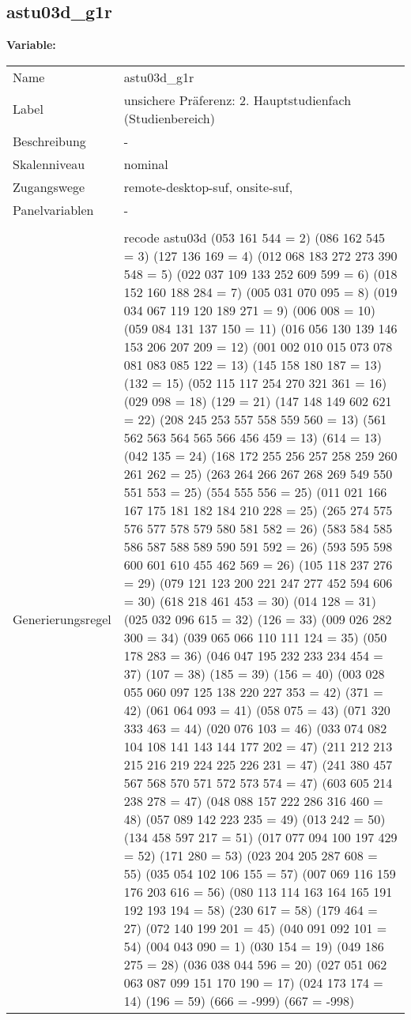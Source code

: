 	
	
	\subsection{astu03d\_g1r}
	\label{subSection:astu03d_g1r}

	\noindent\textbf{Variable:}\\
		\begin{tabular}{lL{11.3cm}}
			\label{tableVariable:astu03d_g1r}
			Name & astu03d\_g1r \\
			Label & unsichere Präferenz: 2. Hauptstudienfach  (Studienbereich) \\
			Beschreibung & - \\
			Skalenniveau & nominal \\
			Zugangswege &
				remote-desktop-suf,
				onsite-suf,
 \\
			Panelvariablen & -
			 \\
			 \\
					Generierungsregel & recode astu03d (053 161 544 = 2)  (086 162 545 = 3) (127 136 169 = 4) (012 068 183 272 273 390 548 = 5) (022 037 109 133 252 609 599 = 6) (018 152 160 188 284 = 7) (005 031 070 095 = 8) (019 034 067 119 120 189 271 = 9) (006 008 = 10) (059 084 131 137 150 = 11) (016 056 130 139 146 153 206 207 209   = 12) (001 002 010 015 073 078 081 083 085 122  = 13) (145 158 180 187 = 13) (132 = 15) (052 115 117 254 270 321 361 = 16) (029 098 = 18) (129 = 21) (147 148 149 602 621 = 22) (208 245 253 557 558 559 560 = 13) (561 562 563 564 565 566 456 459 = 13) (614 = 13) (042 135 = 24) (168 172 255 256 257 258 259 260 261 262  = 25) (263 264 266 267 268 269 549 550 551 553  = 25) (554 555 556 = 25) (011 021 166 167 175 181 182 184 210 228 = 25) (265 274 575 576 577 578 579 580 581 582 = 26) (583 584 585 586 587 588 589 590 591 592  = 26) (593 595 598 600 601 610 455 462 569 = 26) (105 118 237 276 = 29) (079 121 123 200 221 247 277 452 594 606 = 30) (618 218 461 453 = 30)  (014 128 = 31) (025 032 096 615 = 32) (126 = 33) (009 026 282 300 = 34) (039 065 066 110 111 124 = 35) (050 178 283 = 36) (046 047 195 232 233 234 454 = 37) (107 = 38)    (185 = 39) (156 = 40) (003 028 055 060 097 125 138 220 227 353 = 42)  (371 = 42)  (061 064 093 = 41) (058 075 = 43) (071 320 333 463 = 44)  (020 076 103 = 46) (033 074 082 104 108 141 143 144 177 202  = 47) (211 212 213 215 216 219 224 225 226 231  = 47) (241 380 457 567 568 570 571 572 573 574 = 47) (603 605 214 238 278 = 47) (048 088 157 222 286 316 460 = 48) (057 089 142 223 235 = 49) (013 242 = 50) (134 458 597 217 = 51) (017 077 094 100 197 429 = 52) (171 280 = 53) (023 204 205 287 608 = 55) (035 054 102 106 155 = 57) (007 069 116 159 176 203 616 = 56) (080 113 114 163 164 165 191 192 193 194  = 58) (230 617 = 58) (179 464 = 27) (072 140 199 201 = 45) (040 091 092 101 = 54) (004 043 090 = 1) (030 154 = 19) (049 186 275 = 28) (036 038 044 596 = 20) (027 051 062 063 087 099 151 170 190 = 17) (024 173 174 = 14) (196 = 59) (666 = -999) (667 = -998) 

\end{tabular}
